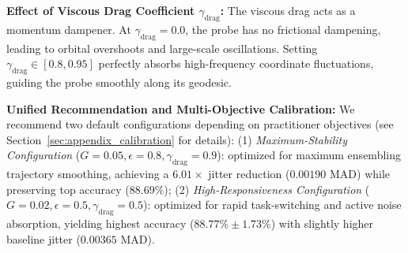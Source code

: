 \textbf{Effect of Viscous Drag Coefficient $\gamma_{\text{drag}}$: }
The viscous drag acts as a momentum dampener. At $\gamma_{\text{drag}} = 0.0$, the probe has no frictional dampening, leading to orbital overshoots and large-scale oscillations. Setting $\gamma_{\text{drag}} \in [0.8, 0.95]$ perfectly absorbs high-frequency coordinate fluctuations, guiding the probe smoothly along its geodesic.

\textbf{Unified Recommendation and Multi-Objective Calibration: }
We recommend two default configurations depending on practitioner objectives (see Section~\ref{sec:appendix_calibration} for details): (1) \textit{Maximum-Stability Configuration} ($G = 0.05, \epsilon = 0.8, \gamma_{\text{drag}} = 0.9$): optimized for maximum ensembling trajectory smoothing, achieving a $6.01\times$ jitter reduction ($0.00190$ MAD) while preserving top accuracy ($88.69\%$); (2) \textit{High-Responsiveness Configuration} ($G = 0.02, \epsilon = 0.5, \gamma_{\text{drag}} = 0.5$): optimized for rapid task-switching and active noise absorption, yielding highest accuracy ($88.77\% \pm 1.73\%$) with slightly higher baseline jitter ($0.00365$ MAD).

